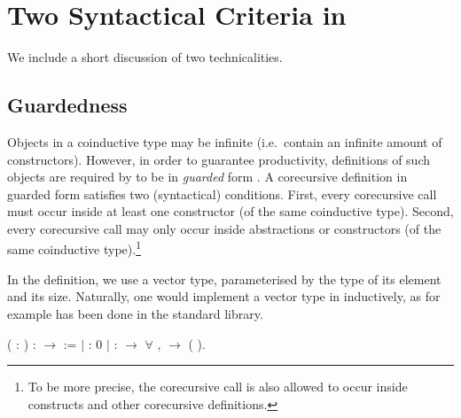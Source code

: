 \chapter{Two Syntactical Criteria in \Coq}\label{chap:appendix}

We include a short discussion of two \Coq technicalities.


\section{Guardedness}\label{sub:guardedness}


Objects in a coinductive type may be infinite (i.e.\ contain an infinite
amount of constructors). However, in order to guarantee productivity,
definitions of such objects are required by \Coq to be in \emph{guarded}
form \citep{gimenez-94}. A corecursive definition in guarded form
satisfies two (syntactical) conditions. First, every corecursive call
must occur inside at least one constructor (of the same coinductive
type). Second, every corecursive call may only occur inside
abstractions or constructors (of the same coinductive
type).\footnote{To be more precise, the corecursive call is also
  allowed to occur inside  constructs and other
  corecursive definitions.}

In the  definition, we use a vector
type, parameterised by the type of its element and its size. Naturally, one
would implement a vector type in \Coq inductively, as for example has been
done in the standard library.
\begin{singlespace}
\begin{coqdoccode}
\coqdocnoindent
{} 
( : ) :
\ensuremath{\rightarrow}  :=\coqdoceol
\coqdocindent{1.00em}
\ensuremath{|}   :
  0\coqdoceol
\coqdocindent{1.00em}
\ensuremath{|}  :
 \ensuremath{\rightarrow} \ensuremath{\forall} ,
 
 \ensuremath{\rightarrow}
 
(
).\coqdoceol
\end{coqdoccode}
\end{singlespace}

